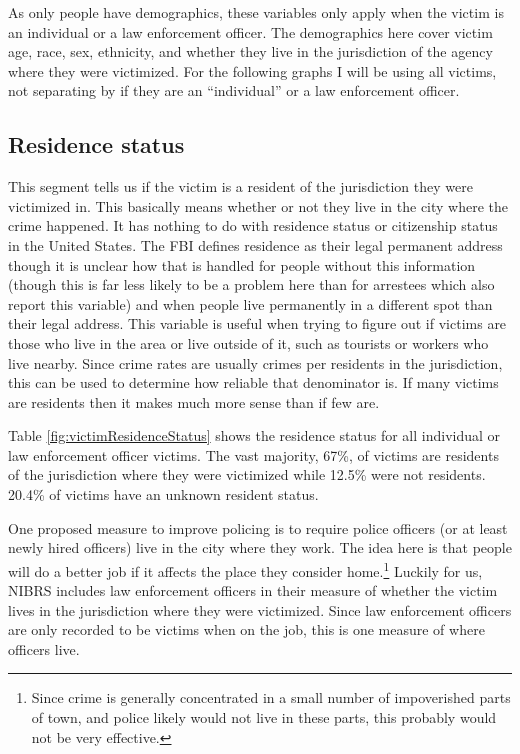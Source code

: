 \documentclass[
]{krantz}
\begin{document}
As only people have demographics, these variables only apply
when the victim is an individual or a law enforcement
officer. The demographics here cover victim age, race, sex,
ethnicity, and whether they live in the jurisdiction of the
agency where they were victimized. For the following graphs
I will be using all victims, not separating by if they are
an ``individual'' or a law enforcement officer.

\subsection{Residence status}\label{residence-status}

This segment tells us if the victim is a resident of the
jurisdiction they were victimized in. This basically means
whether or not they live in the city where the crime
happened. It has nothing to do with residence status or
citizenship status in the United States. The FBI defines
residence as their legal permanent address though it is
unclear how that is handled for people without this
information (though this is far less likely to be a problem
here than for arrestees which also report this variable) and
when people live permanently in a different spot than their
legal address. This variable is useful when trying to figure
out if victims are those who live in the area or live
outside of it, such as tourists or workers who live nearby.
Since crime rates are usually crimes per residents in the
jurisdiction, this can be used to determine how reliable
that denominator is. If many victims are residents then it
makes much more sense than if few are.

Table \ref{fig:victimResidenceStatus} shows the residence
status for all individual or law enforcement officer
victims. The vast majority, 67\%, of victims are residents
of the jurisdiction where they were victimized while 12.5\%
were not residents. 20.4\% of victims have an unknown
resident status.

One proposed measure to improve policing is to require
police officers (or at least newly hired officers) live in
the city where they work. The idea here is that people will
do a better job if it affects the place they consider
home.\footnote{Since crime is generally concentrated in a
  small number of impoverished parts of town, and police
  likely would not live in these parts, this probably would
  not be very effective.} Luckily for us, NIBRS includes law
enforcement officers in their measure of whether the victim
lives in the jurisdiction where they were victimized. Since
law enforcement officers are only recorded to be victims
when on the job, this is one measure of where officers live.
\end{document}
